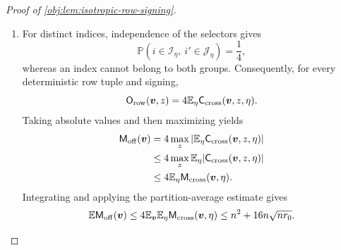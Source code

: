 \begin{proof}[Proof of \cref{obj:lem:isotropic-row-signing}]
\begin{enumerate}
\[\leq\frac{n^2}{4}.
\]
Both group sizes are at most \(n\), so
\[
\begin{aligned}
&4\mathsf N_{\rm sel}(\eta)
\sqrt{\mathsf N_{\rm comp}(\eta)r_0}
+4\mathsf N_{\rm comp}(\eta)
\sqrt{\mathsf N_{\rm sel}(\eta)r_0}\\
&\hspace{2em}\leq
4\bigl(\mathsf N_{\rm sel}(\eta)+\mathsf N_{\rm comp}(\eta)\bigr)
\sqrt{nr_0}
=4n\sqrt{nr_0}.
\end{aligned}
\]
Therefore every selector satisfies
\[
\mathbb E_{\boldsymbol v}\mathsf M_{\rm cross}(\boldsymbol v,\eta)
\leq\frac{n^2}{4}+4n\sqrt{nr_0}.
\]

Averaging this bound over the finite selector space and interchanging the integrable expectations gives
\[
\begin{aligned}
4\mathbb E_{\boldsymbol v}\mathbb E_\eta
\mathsf M_{\rm cross}(\boldsymbol v,\eta)
&=4\mathbb E_\eta\mathbb E_{\boldsymbol v}
\mathsf M_{\rm cross}(\boldsymbol v,\eta)\\
&\leq n^2+16n\sqrt{nr_0}.
\end{aligned}
\]

\item For distinct indices, independence of the selectors gives
\[
\mathbb P(i\in\mathcal I_\eta,\ i'\in\mathcal J_\eta)=\frac14,
\]
whereas an index cannot belong to both groups. Consequently, for every deterministic row tuple and signing,
\[
\mathsf O_{\rm row}(\boldsymbol v,z)
=4\mathbb E_\eta\mathsf C_{\rm cross}(\boldsymbol v,z,\eta).
\]
Taking absolute values and then maximizing yields
\[
\begin{aligned}
\mathsf M_{\rm off}(\boldsymbol v)
&=4\max_z
\left|\mathbb E_\eta\mathsf C_{\rm cross}(\boldsymbol v,z,\eta)\right|\\
&\leq4\max_z
\mathbb E_\eta|\mathsf C_{\rm cross}(\boldsymbol v,z,\eta)|\\
&\leq4\mathbb E_\eta\mathsf M_{\rm cross}(\boldsymbol v,\eta).
\end{aligned}
\]
Integrating and applying the partition-average estimate gives
\[
\mathbb E\mathsf M_{\rm off}(\boldsymbol v)
\leq4\mathbb E_{\boldsymbol v}\mathbb E_\eta
\mathsf M_{\rm cross}(\boldsymbol v,\eta)
\leq n^2+16n\sqrt{nr_0}.
\]


\end{enumerate}
\end{proof}
